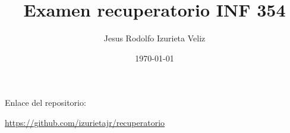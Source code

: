 \documentclass[letter]{article}
\author{Jesus Rodolfo Izurieta Veliz}
\date{\today}
\title{Examen recuperatorio INF 354}
\begin{document}
\maketitle
Enlace del repositorio:

\url{https://github.com/izurietajr/recuperatorio}
\end{document}
